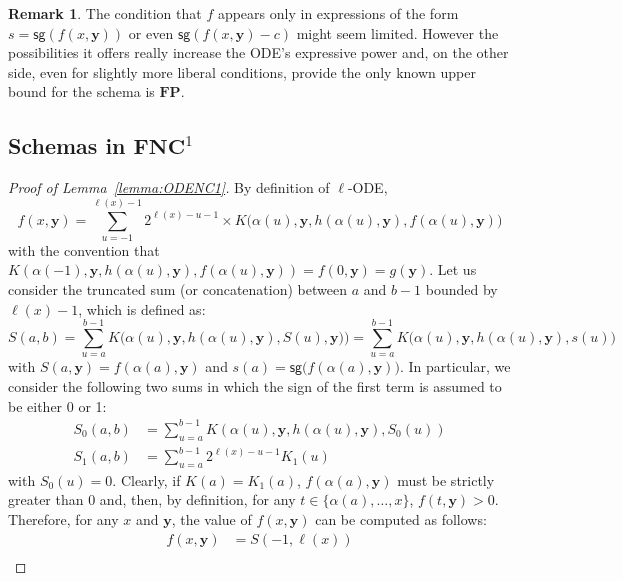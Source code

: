 \documentclass[11pt, oneside]{article}
\newenvironment{toappendix}{}{}
\newcommand{\fun}[1]{\mathsf{#1}}
\newcommand{\FP}{\mathbf{FP}}
\newcommand{\NC}{\mathbf{FNC}}
\newcommand{\tu}[1]{\mathbf{#1}}
\theoremstyle{definition}
\newtheorem{remark}{Remark}
\begin{document}
\begin{remark}
    The condition that $f$ appears only in expressions of the form $s=\fun{sg}(f(x, \tu y))$ or even  $\fun{sg}(f(x, \tu y)-c)$ might seem limited. However the possibilities it offers really increase the ODE's expressive power and, on the other side, even for slightly more liberal conditions, provide the only known upper bound for the schema is $\FP$. 
\end{remark}








\begin{toappendix}
\subsection{Schemas in $\NC^1$}\label{appendixNC}
\begin{proof}[Proof of Lemma~\ref{lemma:ODENC1}]
    By definition of $\ell$-ODE,
    $$
        f(x, \tu y) = \sum^{\ell(x)-1}_{u=-1} 2^{\ell(x)-u-1} \times K\big(\alpha(u), \tu y, h(\alpha(u), \tu y), f(\alpha(u), \tu y)\big)
    $$
    with the convention that $K(\alpha(-1), \tu y, h(\alpha(u), \tu y), f(\alpha(u), \tu y))=f(0, \tu y)=g(\tu y)$.
    Let us consider the truncated sum (or concatenation) between $a$ and $b-1$ bounded by $\ell(x)-1$, which is defined as:
    $$
    S(a,b) = \sum^{b-1}_{u=a} K\big(\alpha(u), \tu y, h(\alpha(u), \tu y), S(u), \tu y)\big) = \sum^{b-1}_{u=a} K\big(\alpha(u), \tu y, h(\alpha(u), \tu y), s(u)\big)
    $$
    with $S(a, \tu y)=f(\alpha(a), \tu y)$ and $s(a) = \fun{sg}\big(f(\alpha(a), \tu y)\big)$.
    In particular, we consider the following two sums in which the sign of the first term is assumed to be either 0 or 1:
    \begin{align*}
        S_0(a, b) &= \sum^{b-1}_{u=a} K(\alpha(u), \tu y, h(\alpha(u), \tu y), S_0(u)) \\
        S_1(a, b) &= \sum^{b-1}_{u=a} 2^{\ell(x)-u-1} K_1(u)
    \end{align*}
    with $S_0(u)=0$. %
    Clearly, if $K(a)=K_1(a)$, $f(\alpha(a), \tu y)$ must be strictly greater than 0 and, then, by definition, for any $t\in \{\alpha(a),\dots, x\}$, $f(t, \tu y)>0$.
    Therefore, for any $x$ and $\tu y$, the value of $f(x, \tu y)$ can be computed as follows:
    \begin{align*}
        f(x, \tu y) &= S(-1, \ell(x)) \\

\end{align*}
\end{proof}
\end{toappendix}
\end{document}

